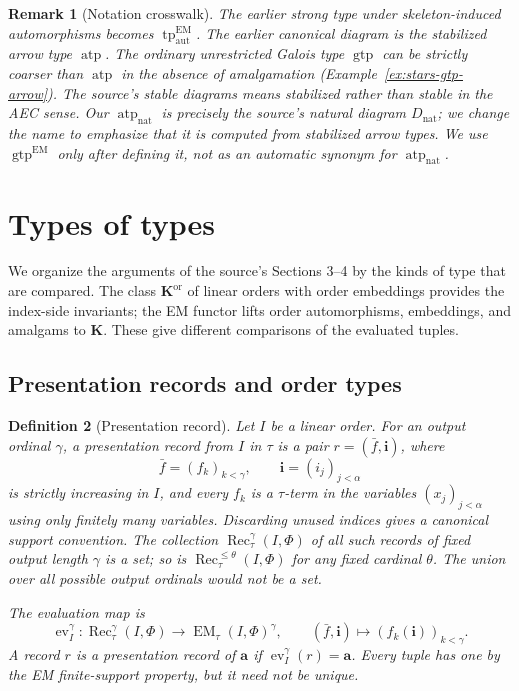 \documentclass[11pt]{article}
\newcommand{\K}{\mathbf K}
\newcommand{\atp}{\operatorname{atp}}
\newcommand{\natatp}{\operatorname{atp}_{\mathrm{nat}}}
\newcommand{\gtp}{\operatorname{gtp}}
\newcommand{\EMauttp}{\operatorname{tp}^{\mathrm{EM}}_{\mathrm{aut}}}
\newcommand{\Kord}{\mathbf K^{\mathrm{or}}}
\newcommand{\Rec}{\operatorname{Rec}}
\newcommand{\ba}{\mathbf{a}}
\newcommand{\bi}{\mathbf{i}}
\theoremstyle{plain}
\newtheorem{definition}{Definition}[section]
\newtheorem{remark}[definition]{Remark}
\begin{document}
\begin{remark}[Notation crosswalk]
The earlier strong type under skeleton-induced automorphisms
becomes $\EMauttp$. The earlier canonical diagram is the
stabilized arrow type $\atp$. The ordinary unrestricted
Galois type $\gtp$ can be strictly coarser than
$\atp$ in the absence of amalgamation
(Example~\ref{ex:stars-gtp-arrow}). The source's stable diagrams
means \emph{stabilized} rather than stable in
the AEC sense. Our $\natatp$ is precisely the
source's natural diagram $D_{\mathrm{nat}}$;
we change the name to emphasize that it is
computed from stabilized arrow types. We use $\gtp^{\mathrm{EM}}$ only after
defining it, not as an automatic synonym for $\natatp$.
\end{remark}

\section{Types of types}\label{sec:types}
We organize the arguments of the source's Sections 3--4 by
the kinds of type that are compared. The class
$\Kord$ of linear orders with order embeddings
provides the index-side invariants; the EM functor
lifts order automorphisms, embeddings, and amalgams
to $\K$. These give different comparisons of the
evaluated tuples.

\subsection{Presentation records and order types}\label{sec:records}
\begin{definition}[Presentation record]\label{def:records}
Let $I$ be a linear order. For an output ordinal
$\gamma$, a \emph{presentation record from $I$ in $\tau$}
is a pair $r=(\bar f,\bi)$, where
\[
\bar f=(f_k)_{k<\gamma},\qquad
\bi=(i_j)_{j<\alpha}
\]
is strictly increasing in $I$, and every $f_k$ is
a $\tau$-term in the variables $(x_j)_{j<\alpha}$
using only finitely many variables. Discarding
unused indices gives a canonical support convention.
The collection $\Rec^\gamma_\tau(I,\Phi)$ of all such
records of fixed output length $\gamma$ is a set;
so is $\Rec^{\leq\theta}_\tau(I,\Phi)$ for any
fixed cardinal $\theta$. The union over all
possible output ordinals would not be a set.

The \emph{evaluation map} is
\[
\operatorname{ev}_I^\gamma:
\Rec^\gamma_\tau(I,\Phi)\longrightarrow
\operatorname{EM}_\tau(I,\Phi)^\gamma,\qquad
(\bar f,\bi)\longmapsto (f_k(\bi))_{k<\gamma}.
\]
A record $r$ is a presentation record \emph{of}
$\ba$ if $\operatorname{ev}_I^\gamma(r)=\ba$.
Every tuple has one by the EM finite-support
property, but it need not be unique.
\end{definition}
\end{document}
